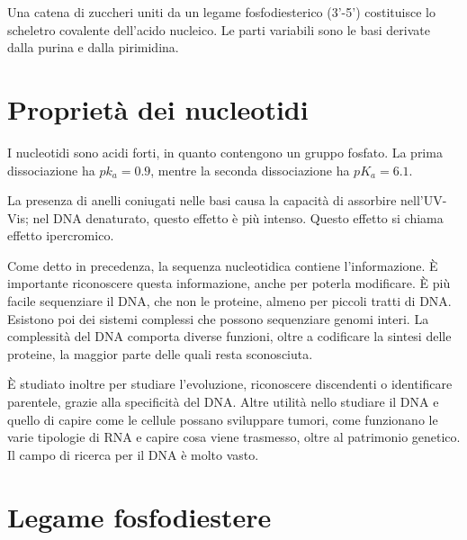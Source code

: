 Una catena di zuccheri uniti da un legame fosfodiesterico (3'-5') costituisce lo scheletro covalente dell'acido nucleico. Le parti variabili sono le basi derivate dalla purina e dalla pirimidina.



\section{Proprietà dei nucleotidi}

I nucleotidi sono acidi forti, in quanto contengono un gruppo fosfato. La prima dissociazione ha $pk_a=0.9$, mentre la seconda dissociazione ha $pK_a=6.1$.

La presenza di anelli coniugati nelle basi causa la capacità di assorbire nell'UV-Vis; nel DNA denaturato, questo effetto è più intenso. Questo effetto si chiama effetto ipercromico.


Come detto in precedenza, la sequenza nucleotidica contiene l'informazione. È importante riconoscere questa informazione, anche per poterla modificare.
È più facile sequenziare il DNA, che non le proteine, almeno per piccoli tratti di DNA. Esistono poi dei sistemi complessi che possono sequenziare genomi interi.
La complessità del DNA comporta diverse funzioni, oltre a codificare la sintesi delle proteine, la maggior parte delle quali resta sconosciuta.

È studiato inoltre per studiare l'evoluzione, riconoscere discendenti o identificare parentele, grazie alla specificità del DNA.
Altre utilità nello studiare il DNA e quello di capire come le cellule possano sviluppare tumori, come funzionano le varie tipologie di RNA e capire cosa viene trasmesso, oltre al patrimonio genetico.
Il campo di ricerca per il DNA è molto vasto.

\section{Legame fosfodiestere}

